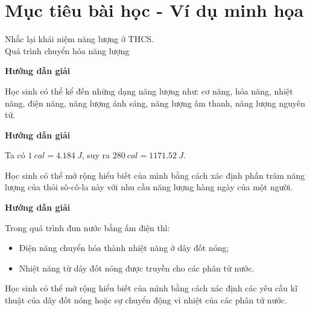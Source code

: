 	\section{Mục tiêu bài học - Ví dụ minh họa}
	\begin{dang}{Nhắc lại khái niệm năng lượng ở THCS. \\Quá trình chuyển hóa năng lượng}
		{\begin{center}
				\textbf{Hướng dẫn giải}
			\end{center}
			
			Học sinh có thể kể đến những dạng năng lượng như: cơ năng, hóa năng, nhiệt năng, điện năng, năng lượng ánh sáng, năng lượng âm thanh, năng lượng nguyên tử.
		}
		
		{\begin{center}
				\textbf{Hướng dẫn giải}
			\end{center}
			
			Ta có $\SI{1}{cal} = \SI{4.184}{J}$, suy ra $\SI{280}{cal} = \SI{1171.52}{J}$.
			
			Học sinh có thể mở rộng hiểu biết của mình bằng cách xác định phần trăm năng lượng của thỏi sô-cô-la này với nhu cầu năng lượng hàng ngày của một người.
		}
		
		{\begin{center}
				\textbf{Hướng dẫn giải}
			\end{center}
			
			Trong quá trình đun nước bằng ấm điện thì:
			\begin{itemize}
				\item Điện năng chuyển hóa thành nhiệt năng ở dây đốt nóng;
				\item Nhiệt năng từ dây đốt nóng được truyền cho các phân tử nước. 
			\end{itemize}
			
			Học sinh có thể mở rộng hiểu biết của mình bằng cách xác định các yêu cầu kĩ thuật của dây đốt nóng hoặc sự chuyển động vì nhiệt của các phân tử nước.
		}
	\end{dang}
